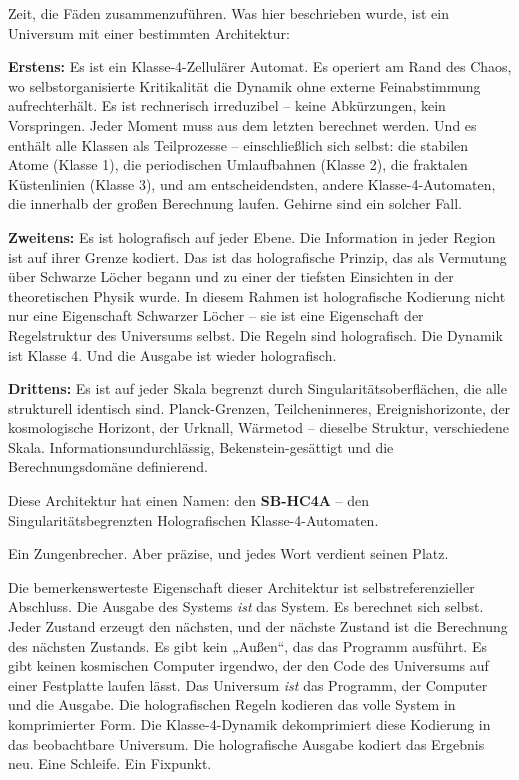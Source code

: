 \documentclass[11pt, twoside, openright]{book}
\begin{document}
Zeit, die Fäden zusammenzuführen. Was hier beschrieben wurde, ist ein Universum mit einer bestimmten Architektur:

\textbf{Erstens:} Es ist ein Klasse-4-Zellulärer Automat. Es operiert am Rand des Chaos, wo selbstorganisierte Kritikalität die Dynamik ohne externe Feinabstimmung aufrechterhält. Es ist rechnerisch irreduzibel -- keine Abkürzungen, kein Vorspringen. Jeder Moment muss aus dem letzten berechnet werden. Und es enthält alle Klassen als Teilprozesse -- einschließlich sich selbst: die stabilen Atome (Klasse 1), die periodischen Umlaufbahnen (Klasse 2), die fraktalen Küstenlinien (Klasse 3), und am entscheidendsten, andere Klasse-4-Automaten, die innerhalb der großen Berechnung laufen. Gehirne sind ein solcher Fall.

\textbf{Zweitens:} Es ist holografisch auf jeder Ebene. Die Information in jeder Region ist auf ihrer Grenze kodiert. Das ist das holografische Prinzip, das als Vermutung über Schwarze Löcher begann und zu einer der tiefsten Einsichten in der theoretischen Physik wurde. In diesem Rahmen ist holografische Kodierung nicht nur eine Eigenschaft Schwarzer Löcher -- sie ist eine Eigenschaft der Regelstruktur des Universums selbst. Die Regeln sind holografisch. Die Dynamik ist Klasse 4. Und die Ausgabe ist wieder holografisch.

\textbf{Drittens:} Es ist auf jeder Skala begrenzt durch Singularitätsoberflächen, die alle strukturell identisch sind. Planck-Grenzen, Teilcheninneres, Ereignishorizonte, der kosmologische Horizont, der Urknall, Wärmetod -- dieselbe Struktur, verschiedene Skala. Informationsundurchlässig, Bekenstein-gesättigt und die Berechnungsdomäne definierend.

Diese Architektur hat einen Namen: den \textbf{SB-HC4A} -- den Singularitätsbegrenzten Holografischen Klasse-4-Automaten.

Ein Zungenbrecher. Aber präzise, und jedes Wort verdient seinen Platz.

Die bemerkenswerteste Eigenschaft dieser Architektur ist selbstreferenzieller Abschluss. Die Ausgabe des Systems \textit{ist} das System. Es berechnet sich selbst. Jeder Zustand erzeugt den nächsten, und der nächste Zustand ist die Berechnung des nächsten Zustands. Es gibt kein „Außen“, das das Programm ausführt. Es gibt keinen kosmischen Computer irgendwo, der den Code des Universums auf einer Festplatte laufen lässt. Das Universum \textit{ist} das Programm, der Computer und die Ausgabe. Die holografischen Regeln kodieren das volle System in komprimierter Form. Die Klasse-4-Dynamik dekomprimiert diese Kodierung in das beobachtbare Universum. Die holografische Ausgabe kodiert das Ergebnis neu. Eine Schleife. Ein Fixpunkt.
\end{document}
